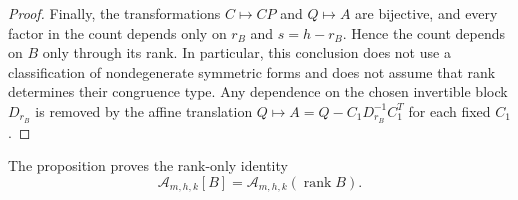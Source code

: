 \documentclass[11pt]{article}
\newcommand{\rank}{\operatorname{rank}}
\newcommand{\1}{\mathbf 1}
\theoremstyle{plain}
\theoremstyle{definition}
\theoremstyle{remark}
\begin{document}
\begin{proof}
Finally, the transformations $C\mapsto CP$ and $Q\mapsto A$ are bijective,
and every factor in the count depends only on $r_B$ and
$s=h-r_B$.  Hence the count depends on $B$ only through its rank.  In
particular, this conclusion does not use a classification of nondegenerate
symmetric forms and does not assume that rank determines their congruence
type.  Any dependence on the chosen invertible block $D_{r_B}$ is removed by
the affine translation $Q\mapsto A=Q-C_1D_{r_B}^{-1}C_1^T$ for each fixed
$C_1$.
\end{proof}

The proposition proves the rank-only identity
\begin{equation}
 \mathcal A_{m,h,k}[B]
 =\mathcal A_{m,h,k}(\rank B).
 \label{eq:A-completion-rank-definition}
\end{equation}
\end{document}
